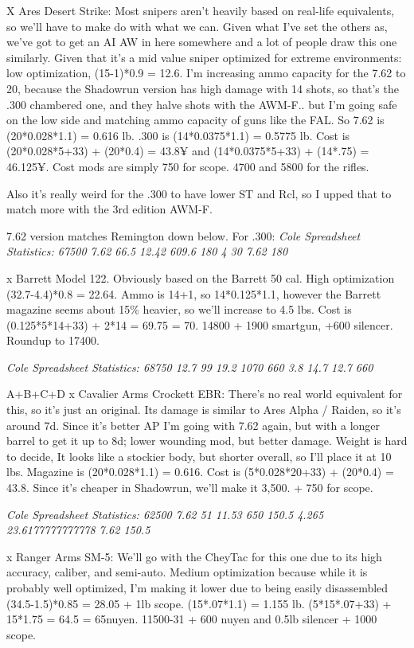 \begin{multicols*}{2}
	X Ares Desert Strike: Most snipers aren't heavily based on real-life equivalents, so we'll have to make do with what we can. Given what I've set the others as, we've got to get an AI AW in here somewhere and a lot of people draw this one similarly. Given that it's a mid value sniper optimized for extreme environments: low optimization, (15-1)*0.9 = 12.6. I'm increasing ammo capacity for the 7.62 to 20, because the Shadowrun version has high damage with 14 shots, so that's the .300 chambered one, and they halve shots with the AWM-F.. but I'm going safe on the low side and matching ammo capacity of guns like the FAL. So 7.62 is (20*0.028*1.1) = 0.616 lb. .300 is (14*0.0375*1.1) = 0.5775 lb. Cost is (20*0.028*5+33) + (20*0.4) = 43.8¥ and (14*0.0375*5+33) + (14*.75) = 46.125¥. Cost mods are simply 750 for scope. 4700 and 5800 for the rifles.
	
	Also it's really weird for the .300 to have lower ST and Rcl, so I upped that to match more with the 3rd edition AWM-F.
	
	7.62 version matches Remington down below.
	For .300:
	\textit{\textcolor{OliveGreen}{Cole Spreadsheet Statistics: 67500 7.62 66.5 12.42 609.6 180 4 30 7.62 180}}
	
	x Barrett Model 122. Obviously based on the Barrett 50 cal. High optimization (32.7-4.4)*0.8 = 22.64. Ammo is  14+1, so  14*0.125*1.1, however the Barrett magazine seems about 15\% heavier, so we'll increase to 4.5 lbs. Cost is (0.125*5*14+33) + 2*14 = 69.75 = 70. 14800 + 1900 smartgun, +600 silencer. Roundup to 17400.
	
	\textit{\textcolor{OliveGreen}{Cole Spreadsheet Statistics: 68750 12.7 99 19.2 1070 660 3.8 14.7 12.7 660}}
	
	A+B+C+D
	x Cavalier Arms Crockett EBR: There's no real world equivalent for this, so it's just an original. Its damage is similar to Ares Alpha / Raiden, so it's around 7d. Since it's better AP I'm going with 7.62 again, but with a longer barrel to get it up to 8d; lower wounding mod, but better damage. Weight is hard to decide,  It looks like a stockier body, but shorter overall, so I'll place it at 10 lbs. Magazine is (20*0.028*1.1) = 0.616. Cost is (5*0.028*20+33) + (20*0.4) = 43.8. Since it's cheaper in Shadowrun, we'll make it 3,500. + 750 for scope.
	
	\textit{\textcolor{OliveGreen}{Cole Spreadsheet Statistics: 62500 7.62 51 11.53 650 150.5 4.265 23.6177777777778 7.62 150.5}}
	
	x Ranger Arms SM-5: We'll go with the CheyTac for this one due to its high accuracy, caliber, and semi-auto. Medium optimization because while it is probably well optimized, I'm making it lower due to being easily disassembled (34.5-1.5)*0.85 = 28.05 + 1lb scope. (15*.07*1.1)  = 1.155 lb. (5*15*.07+33) + 15*1.75 = 64.5 = 65nuyen. 11500-31 + 600 nuyen and 0.5lb silencer +  1000 scope.
	

\end{multicols*}

